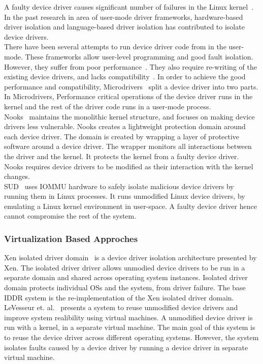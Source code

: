 A faulty device driver causes significant number of failures in the Linux kernel~\cite{tanenbaum2006can, coverity}. In the past research in area of user-mode driver frameworks, hardware-based driver isolation and language-based driver isolation has contributed to isolate device drivers.
\\[3mm]
There have been several attempts to run device driver code from in the user-mode. These frameworks allow user-level programming and good fault isolation. However, they suffer from poor performance~\cite{armand1991give}. They also require re-writing of the existing device drivers, and lacks compatibility~\cite{Leslie+:jcst2005}. In order to achieve the good performance and compatibility, Microdrivers~\cite{Ganapathy:2008:DIM:1346281.1346303} split a device driver into two parts. In Microdrivers, Performance critical operations of the device driver runs in the kernel and the rest of the driver code runs in a user-mode process. 
\\[3mm]
Nooks~\cite{swift2005improving} maintains the monolithic kernel structure, and focuses on making device drivers less vulnerable. Nooks creates a lightweight protection domain around each device driver. The domain is created by wrapping a layer of protective software around a device driver. 
The wrapper monitors all interactions between the driver and the kernel. It protects the kernel from a faulty device driver. Nooks requires device drivers to be modified as their interaction with the kernel changes. 
\\[3mm]
SUD~\cite{Boyd-Wickizer+:atc2010} uses IOMMU hardware to safely isolate malicious device drivers by running them in Linux processes. It runs unmodified Linux device drivers, by emulating a Linux kernel environment in user-space. A faulty device driver hence cannot compromise the rest of the system.

\subsubsection*{Virtualization Based Approches}

Xen isolated driver domain~\cite{Fraser04safehardware} is a device driver isolation architecture presented by Xen. The isolated driver driver allows unmodied device drivers to be run in a separate domain and shared across operating system instances. Isolated driver domain protects individual OSs and the system, from driver failure. The base IDDR system is the re-implementation of the Xen isolated driver domain. 
\\[3mm]
LeVesseur et. al.~\cite{LeVasseur04UnmodifiedDriverReuse} presents a system to reuse unmodified device drivers and improve system realibility using virtual machines. A unmodified device driver is run with a kernel, in a separate virtual machine. The main goal of this system is to reuse the device driver across different operating systems. However, the system isolates faults caused by a device driver by running a device driver in separate virtual machine.

